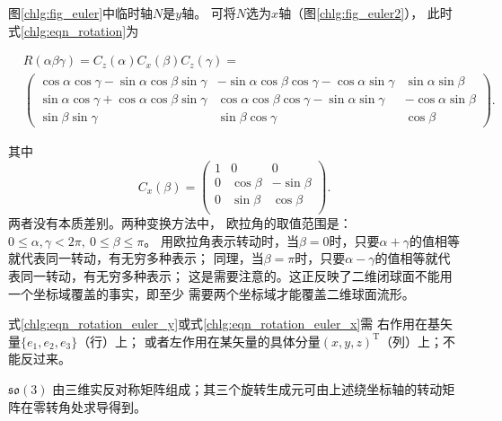 图\ref{chlg:fig_euler}中临时轴$N$是$y$轴。
可将$N$选为$x$轴（图\ref{chlg:fig_euler2}），
此时式\eqref{chlg:eqn_rotation}为
\begin{small}

\begin{equation}\label{chlg:eqn_rotation_euler_x}
    \begin{aligned}
        &R(\alpha\beta\gamma)=C_z(\alpha)C_x(\beta)C_z(\gamma) =   \\
        &\begin{pmatrix}
            \cos\alpha \cos\gamma-\sin\alpha \cos\beta \sin\gamma  & -\sin\alpha \cos\beta \cos\gamma -\cos\alpha \sin\gamma &  \sin\alpha \sin\beta \\
            \sin\alpha \cos\gamma+\cos\alpha \cos\beta \sin\gamma  &  \cos\alpha \cos\beta \cos\gamma -\sin\alpha \sin\gamma & -\cos\alpha \sin\beta \\
            \sin\beta  \sin\gamma & \sin\beta \cos\gamma  & \cos\beta
        \end{pmatrix} .
    \end{aligned}
\end{equation}
\end{small}
其中
\begin{equation}\label{chlg:eqn_rotation-x}
    {C_x}( \beta  ) = \begin{pmatrix}
        1&0&0 \\
        0&{\cos \beta }&{ - \sin \beta } \\
        0&{\sin \beta }&{\cos \beta } \\
    \end{pmatrix} .
\end{equation}
两者没有本质差别。两种变换方法中，
欧拉角的取值范围是：$0 \leqslant \alpha, \gamma < 2\pi,\ 0\leqslant \beta \leqslant \pi$。
用欧拉角表示转动时，当$\beta=0$时，只要$\alpha+\gamma$的值相等就代表同一转动，有无穷多种表示；
同理，当$\beta=\pi$时，只要$\alpha-\gamma$的值相等就代表同一转动，有无穷多种表示；
这是需要注意的。这正反映了二维闭球面不能用一个坐标域覆盖的事实，即至少
需要两个坐标域才能覆盖二维球面流形。

式\eqref{chlg:eqn_rotation_euler_y}或式\eqref{chlg:eqn_rotation_euler_x}需
右作用在基矢量$\{e_1,e_2,e_3\}$（行）上；
或者左作用在某矢量的具体分量$(x,y,z)^{\mathrm{T}}$（列）上；不能反过来。

$\mathfrak{so}(3)$ 由三维实反对称矩阵组成；其三个旋转生成元可由上述绕坐标轴的转动矩阵在零转角处求导得到。

